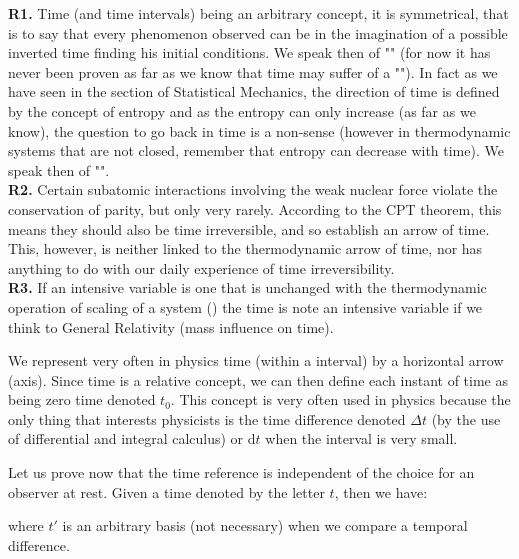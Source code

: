	\begin{tcolorbox}[title=Remarks,colframe=black,arc=10pt]
	\textbf{R1.} Time (and time intervals) being an arbitrary concept, it is symmetrical, that is to say that every phenomenon observed can be in the imagination of a possible inverted time finding his initial conditions. We speak then of "" (for now it has never been proven as far as we know that time may suffer of a ""). In fact as we have seen in the section of Statistical Mechanics, the direction of time is defined by the concept of entropy and as the entropy can only increase (as far as we know), the question to go back in time is a non-sense (however in thermodynamic systems that are not closed, remember that entropy can decrease with time). We speak then of "".\\
	
	\textbf{R2.} Certain subatomic interactions involving the weak nuclear force violate the conservation of parity, but only very rarely. According to the CPT theorem, this means they should also be time irreversible, and so establish an arrow of time. This, however, is neither linked to the thermodynamic arrow of time, nor has anything to do with our daily experience of time irreversibility.\\
	
	\textbf{R3.} If an intensive variable is one that is unchanged with the thermodynamic operation of scaling of a system () the time is note an intensive variable if we think to General Relativity (mass influence on time).
	\end{tcolorbox}	
	We represent very often in physics time (within a interval) by a horizontal arrow (axis). Since time is a relative concept, we can then define each instant of time as being zero time denoted $t_0$. This concept is very often used in physics because the only thing that interests physicists is the time difference denoted $\Delta t$ (by the use of differential and integral calculus) or $\mathrm{d}t$ when the interval is very small.
	
	Let us prove now that the time reference is independent of the choice for an observer at rest. Given a time denoted by the letter $t$, then we have:
	
	where $t'$ is an arbitrary basis (not necessary) when we compare a temporal difference.
	

